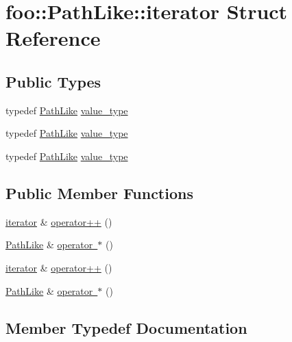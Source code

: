 \hypertarget{structfoo_1_1_path_like_1_1iterator}{}\section{foo\+::Path\+Like\+::iterator Struct Reference}
\label{structfoo_1_1_path_like_1_1iterator}
\subsection*{Public Types}
\begin{DoxyCompactItemize}
\item 
typedef \mbox{\hyperlink{classfoo_1_1_path_like}{Path\+Like}} \mbox{\hyperlink{structfoo_1_1_path_like_1_1iterator_a797c204878a09e04b23cfe6b48ac7016}{value\+\_\+type}}
\item 
typedef \mbox{\hyperlink{classfoo_1_1_path_like}{Path\+Like}} \mbox{\hyperlink{structfoo_1_1_path_like_1_1iterator_a797c204878a09e04b23cfe6b48ac7016}{value\+\_\+type}}
\item 
typedef \mbox{\hyperlink{classfoo_1_1_path_like}{Path\+Like}} \mbox{\hyperlink{structfoo_1_1_path_like_1_1iterator_a797c204878a09e04b23cfe6b48ac7016}{value\+\_\+type}}
\end{DoxyCompactItemize}
\subsection*{Public Member Functions}
\begin{DoxyCompactItemize}
\item 
\mbox{\hyperlink{structfoo_1_1_path_like_1_1iterator}{iterator}} \& \mbox{\hyperlink{structfoo_1_1_path_like_1_1iterator_a35946d5efe98fa787944ec623dad0cd8}{operator++}} ()
\item 
\mbox{\hyperlink{classfoo_1_1_path_like}{Path\+Like}} \& \mbox{\hyperlink{structfoo_1_1_path_like_1_1iterator_accc280da6edf4fe7c89116878ea781d6}{operator $\ast$}} ()
\item 
\mbox{\hyperlink{structfoo_1_1_path_like_1_1iterator}{iterator}} \& \mbox{\hyperlink{structfoo_1_1_path_like_1_1iterator_a35946d5efe98fa787944ec623dad0cd8}{operator++}} ()
\item 
\mbox{\hyperlink{classfoo_1_1_path_like}{Path\+Like}} \& \mbox{\hyperlink{structfoo_1_1_path_like_1_1iterator_accc280da6edf4fe7c89116878ea781d6}{operator $\ast$}} ()
\end{DoxyCompactItemize}


\subsection{Member Typedef Documentation}
\mbox{\label{structfoo_1_1_path_like_1_1iterator_a797c204878a09e04b23cfe6b48ac7016}} 
